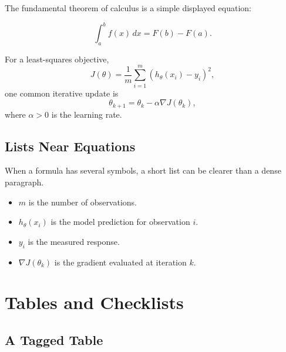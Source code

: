 \documentclass[11pt, letterpaper]{article}
\newcommand{\taggedsection}[1]{\section{\texorpdfstring{\color{MainBlue}#1}{#1}}}
\newcommand{\taggedsubsection}[1]{\subsection{\texorpdfstring{\color{DarkGreen}#1}{#1}}}
\begin{document}
The fundamental theorem of calculus is a simple displayed equation:

\begin{equation}
	\int_a^b f(x)\,dx = F(b)-F(a).
	\label{eq:ftc}
\end{equation}

For a least-squares objective,
\begin{equation}
	J(\theta)=\frac{1}{m}\sum_{i=1}^{m}\left(h_\theta(x_i)-y_i\right)^2,
	\label{eq:objective}
\end{equation}
one common iterative update is
\begin{equation}
	\theta_{k+1}=\theta_k-\alpha\nabla J(\theta_k),
	\label{eq:gradient-update}
\end{equation}
where \(\alpha>0\) is the learning rate.

\taggedsubsection{Lists Near Equations}

When a formula has several symbols, a short list can be clearer than a dense paragraph.

\begin{itemize}
	\item \(m\) is the number of observations.
	\item \(h_\theta(x_i)\) is the model prediction for observation \(i\).
	\item \(y_i\) is the measured response.
	\item \(\nabla J(\theta_k)\) is the gradient evaluated at iteration \(k\).
\end{itemize}

\taggedsection{Tables and Checklists}

\taggedsubsection{A Tagged Table}
\end{document}
